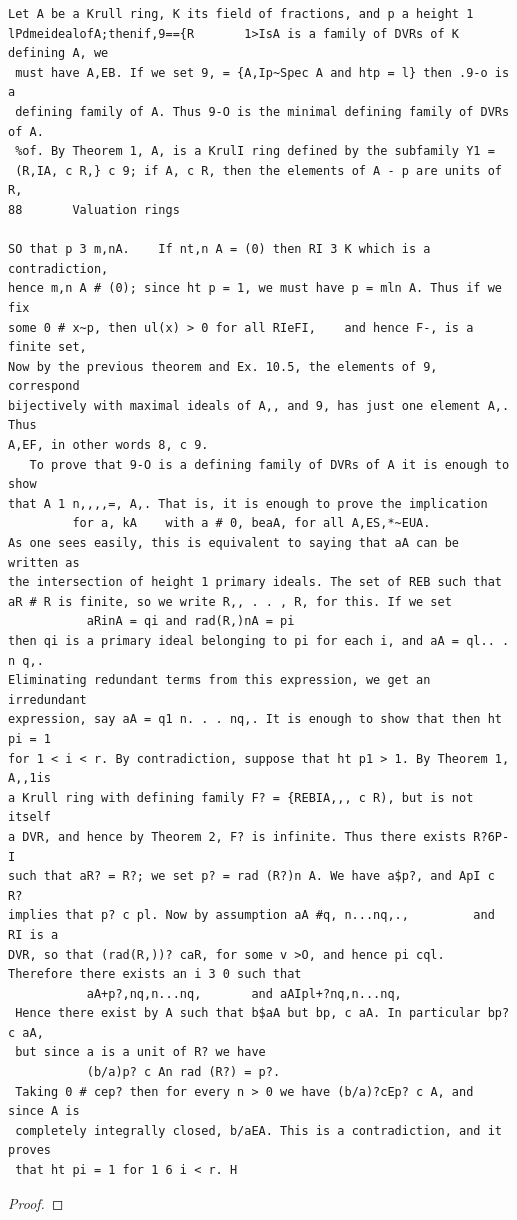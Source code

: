 \begin{theorem}\label{mcrt-auto-theorem-12-3}\uses{}
\begin{verbatim}
Let A be a Krull ring, K its field of fractions, and p a height 1
lPdmeidealofA;thenif,9=={R       1>IsA is a family of DVRs of K defining A, we
 must have A,EB. If we set 9, = {A,Ip~Spec A and htp = l} then .9-o is a
 defining family of A. Thus 9-O is the minimal defining family of DVRs of A.
 %of. By Theorem 1, A, is a KrulI ring defined by the subfamily Y1 =
 (R,IA, c R,} c 9; if A, c R, then the elements of A - p are units of R,
88       Valuation rings

SO that p 3 m,nA.    If nt,n A = (0) then RI 3 K which is a contradiction,
hence m,n A # (0); since ht p = 1, we must have p = mln A. Thus if we fix
some 0 # x~p, then ul(x) > 0 for all RIeFI,    and hence F-, is a finite set,
Now by the previous theorem and Ex. 10.5, the elements of 9, correspond
bijectively with maximal ideals of A,, and 9, has just one element A,. Thus
A,EF, in other words 8, c 9.
   To prove that 9-O is a defining family of DVRs of A it is enough to show
that A 1 n,,,,=, A,. That is, it is enough to prove the implication
         for a, kA    with a # 0, beaA, for all A,ES,*~EUA.
As one sees easily, this is equivalent to saying that aA can be written as
the intersection of height 1 primary ideals. The set of REB such that
aR # R is finite, so we write R,, . . , R, for this. If we set
           aRinA = qi and rad(R,)nA = pi
then qi is a primary ideal belonging to pi for each i, and aA = ql.. . n q,.
Eliminating redundant terms from this expression, we get an irredundant
expression, say aA = q1 n. . . nq,. It is enough to show that then ht pi = 1
for 1 < i < r. By contradiction, suppose that ht p1 > 1. By Theorem 1, A,,1is
a Krull ring with defining family F? = {REBIA,,, c R), but is not itself
a DVR, and hence by Theorem 2, F? is infinite. Thus there exists R?6P-I
such that aR? = R?; we set p? = rad (R?)n A. We have a$p?, and ApI c R?
implies that p? c pl. Now by assumption aA #q, n...nq,.,         and RI is a
DVR, so that (rad(R,))? caR, for some v >O, and hence pi cql.
Therefore there exists an i 3 0 such that
           aA+p?,nq,n...nq,       and aAIpl+?nq,n...nq,
 Hence there exist by A such that b$aA but bp, c aA. In particular bp? c aA,
 but since a is a unit of R? we have
           (b/a)p? c An rad (R?) = p?.
 Taking 0 # cep? then for every n > 0 we have (b/a)?cEp? c A, and since A is
 completely integrally closed, b/aEA. This is a contradiction, and it proves
 that ht pi = 1 for 1 6 i < r. H
\end{verbatim}
\end{theorem}
\begin{proof}
\notready
\end{proof}


